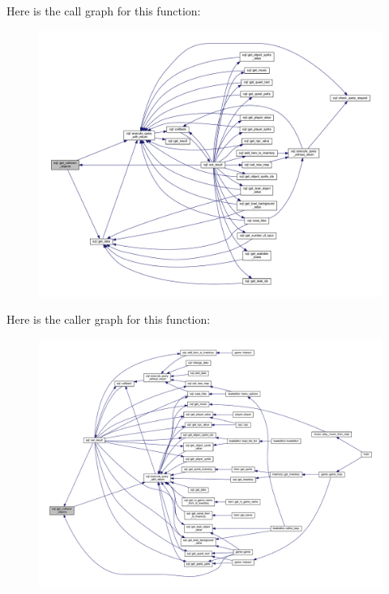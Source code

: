 Here is the call graph for this function\+:
\nopagebreak
\begin{figure}[H]
\begin{center}
\leavevmode
\includegraphics[width=350pt]{classsql_af126860a2afcf82e53c9f895577bab76_cgraph}
\end{center}
\end{figure}
Here is the caller graph for this function\+:
\nopagebreak
\begin{figure}[H]
\begin{center}
\leavevmode
\includegraphics[width=350pt]{classsql_af126860a2afcf82e53c9f895577bab76_icgraph}
\end{center}
\end{figure}
\mbox{\label{classsql_a1cb74ab7343ef603490518715297be83}} 

